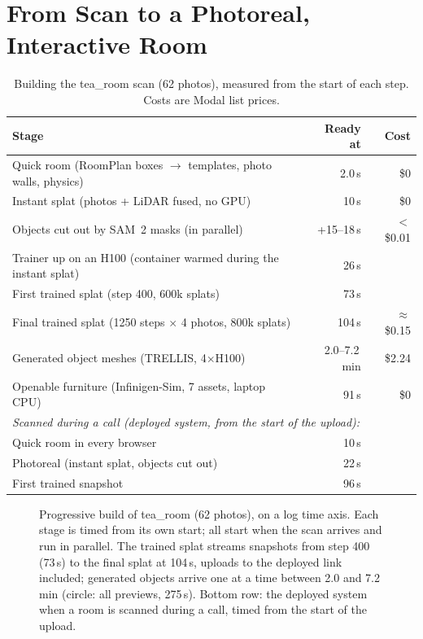 \documentclass[sigconf,review,anonymous]{acmart}
\newcommand{\measured}[1]{#1}
\begin{document}
\section{From Scan to a Photoreal, Interactive Room}
\begin{table}[t]
\caption{Building the tea\_room scan (62 photos), measured from the start of each step. Costs are
Modal list prices.}
\label{tab:timeline}
\begin{tabular}{lrr}
\toprule
Stage & Ready at & Cost \\
\midrule
Quick room (RoomPlan boxes $\rightarrow$ templates, photo walls, physics) & \measured{2.0\,s} & \$0 \\
Instant splat (photos + LiDAR fused, no GPU) & \measured{10\,s} & \$0 \\
Objects cut out by SAM~2 masks (in parallel) & \measured{+15--18\,s} & \measured{$<$\$0.01} \\
Trainer up on an H100 (container warmed during the instant splat) & \measured{26\,s} & \\
First trained splat (step 400, 600k splats) & \measured{73\,s} & \\
Final trained splat (1250 steps $\times$ 4 photos, 800k splats) & \measured{104\,s} & \measured{$\approx$\$0.15} \\
Generated object meshes (TRELLIS, 4$\times$H100) & \measured{2.0--7.2\,min} & \measured{\$2.24} \\
Openable furniture (Infinigen-Sim, 7 assets, laptop CPU) & \measured{91\,s} & \$0 \\
\midrule
\multicolumn{3}{l}{\emph{Scanned during a call (deployed system, from the start of the upload):}} \\
Quick room in every browser & \measured{10\,s} & \\
Photoreal (instant splat, objects cut out) & \measured{22\,s} & \\
First trained snapshot & \measured{96\,s} & \\
\bottomrule
\end{tabular}
\end{table}
\begin{figure}[t]
  \centering
  
  \caption{Progressive build of tea\_room (62 photos), on a log time axis. Each stage is timed
  from its own start; all start when the scan arrives and run in parallel. The trained splat
  streams snapshots from step 400 (73\,s) to the final splat at 104\,s, uploads to the deployed link included; generated objects
  arrive one at a time between 2.0 and 7.2\,min (circle: all previews, 275\,s). Bottom row: the
  deployed system when a room is scanned during a call, timed from the start of the upload.}
  \label{fig:timeline}
\end{figure}
\end{document}
